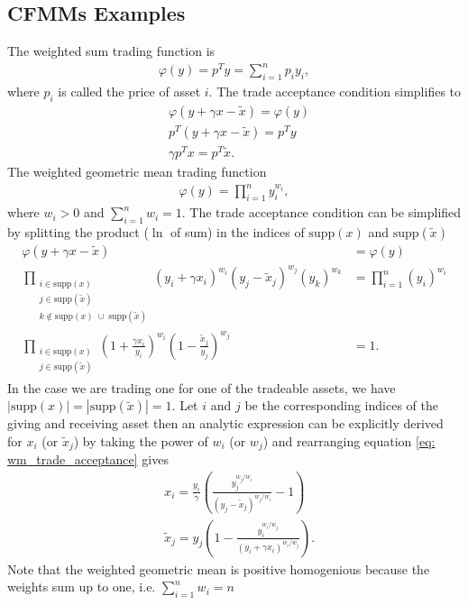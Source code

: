 \subsection{CFMMs Examples}
The weighted sum trading function is
\begin{align}
    \varphi(y) = p^{T}y = \sum_{i=1}^{n} p_i y_i, \label{eq: weighted_sum}
\end{align}
where $p_i$ is called the price of asset $i$. The trade acceptance condition
simplifies to
\begin{align}
    &\varphi(y+\gamma x- \tilde{x}) = \varphi(y) \nonumber \\
    &p^{T} (y +\gamma x - \tilde{x}) = p^{T} y \nonumber \\
    &\gamma p^{T} x = p^{T} \tilde{x}.
\end{align}
The weighted geometric mean trading function
\begin{align}
    \varphi(y) = \prod_{i=1}^{n} y_i^{w_i}, \label{eq: weighted_geo_mean}
\end{align}
where $w_i > 0 $ and $\sum_{i=1}^{n} w_i=1$. The trade acceptance condition can be
simplified by splitting the product ($\ln$ of sum) in the indices of
$\text{supp}(x)$ and $\text{supp}(\tilde{x})$
\begin{align}
    \varphi(y+\gamma x- \tilde{x}) &= \varphi(y) \nonumber \\
    \prod\limits_{\substack{i \in \text{supp}(x) \\
    j \in \text{supp}(\tilde{x}) \\
    k \notin \text{supp}(x)\; \cup\; \text{supp}(\tilde{x})  }}
    (y_i + \gamma x_i)^{w_i}
    (y_j - \tilde{x}_j)^{w_j}
    (y_k)^{w_k} &= \prod_{i=1}^{n} (y_i)^{w_i} \nonumber\\
    \prod\limits_{\substack{i \in \text{supp}(x) \\
    j \in \text{supp}(\tilde{x})}}
    \left(1 + \frac{\gamma x_i}{y_i}\right)^{w_i}
    \left(1 - \frac{\tilde{x}_j}{y_j}\right)^{w_j}
    &= 1.\label{eq: wm_trade_acceptance}
\end{align}
In the case we are trading one for one of the tradeable assets, we have
$|\text{supp}(x)| = |\text{supp}(\tilde{x})| = 1$. Let $i$ and $j$ be the
corresponding indices of the giving and receiving asset then an analytic
expression can be explicitly derived  for $x_i$ (or $\tilde{x}_j$) by taking
the power of $w_i$ (or $w_j$) and rearranging equation
\ref{eq: wm_trade_acceptance} gives
\begin{align}
&x_i = \frac{y_i}{\gamma}\left(
\frac{y_j^{w_j/w_i}}{\left(y_j - \tilde{x}_j \right)^{w_j/w_i}} - 1
\right) \label{eq: gm_fef}\\
&\tilde{x}_j= y_j\left(
    1 - \frac{y_i^{w_i/w_j}}{\left(y_i+\gamma x_i\right)^{w_i/w_j} }
\right) \label{eq: gm_ref}.
\end{align}
Note that the weighted geometric mean is positive homogenious because the
weights sum up to one, i.e. $\sum_{i=1}^{n}w_i = n $


